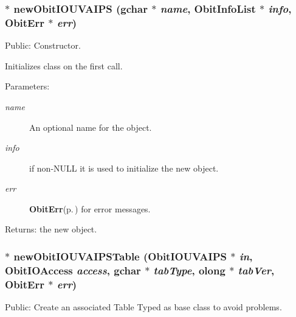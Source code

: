 \subsubsection{$\ast$ new\-Obit\-IOUVAIPS (gchar $\ast$ {\em name}, {\bf Obit\-Info\-List} $\ast$ {\em info}, {\bf Obit\-Err} $\ast$ {\em err})}\label{ObitIOUVAIPS_8h_a4}


Public: Constructor. 

Initializes class on the first call. \begin{Desc}
\item[Parameters:]
\begin{description}
\item[{\em name}]An optional name for the object. \item[{\em info}]if non-NULL it is used to initialize the new object. \item[{\em err}]{\bf Obit\-Err}{\rm (p.\,\pageref{structObitErr})} for error messages. \end{description}
\end{Desc}
\begin{Desc}
\item[Returns:]the new object. \end{Desc}
\subsubsection{$\ast$ new\-Obit\-IOUVAIPSTable ({\bf Obit\-IOUVAIPS} $\ast$ {\em in}, Obit\-IOAccess {\em access}, gchar $\ast$ {\em tab\-Type}, {\bf olong} $\ast$ {\em tab\-Ver}, {\bf Obit\-Err} $\ast$ {\em err})}\label{ObitIOUVAIPS_8h_a24}


Public: Create an associated Table Typed as base class to avoid problems. 

